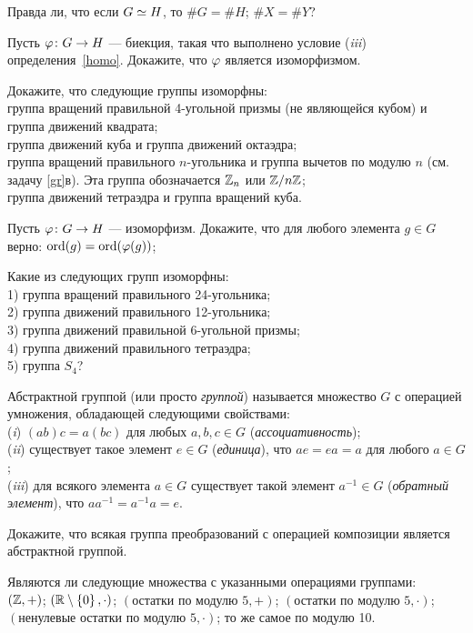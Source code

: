 \documentclass[a4paper,12pt]{article}
\begin{document}
Правда ли, что если $G\simeq H$, то
 $\#G = \#H$;
 $\#X = \#Y$?

Пусть $\varphi \colon G \rightarrow H$ --- биекция, такая что выполнено условие (\emph{iii}\/) определения~\ref{homo}. Докажите, что $\varphi$ является изоморфизмом.


Докажите, что следующие группы изоморфны:\\
 группа вращений правильной 4-угольной призмы (не являющейся кубом) и группа движений квадрата;\\
 группа движений куба и группа движений октаэдра;\\
 группа вращений правильного $n$-угольника и группа вычетов по модулю $n$ (см. задачу \ref{gr}в). Эта группа обозначается $\mathbb{Z}_n$ или $\mathbb{Z}/n\mathbb{Z}$;\\
 группа движений тетраэдра и группа вращений куба.


Пусть $\varphi\colon G\rightarrow H$ --- изоморфизм. Докажите, что
для любого элемента $g\in G$ верно: $\operatorname{ord}(g) = \operatorname{ord}(\varphi(g))$;

Какие из следующих групп изоморфны:\\
1) группа вращений правильного 24-угольника;\\
2) группа движений правильного 12-угольника;\\
3) группа движений правильной 6-угольной призмы;\\
4) группа движений правильного тетраэдра;\\
5) группа $S_4$?




 Абстрактной  группой (или просто \emph{группой}) называется множество $G$ с операцией умножения, обладающей следующими свойствами:\\
(\emph{i}\/) $(ab)c = a(bc)$ для любых $a,b,c\in G$ (\emph{ассоциативность});\\
(\emph{ii}\/) существует такое элемент $e\in G$ (\emph{единица}), что $ae=ea=a$ для любого $a\in G$;\\
(\emph{iii}\/) для всякого элемента $a\in G$ существует такой элемент $a^{-1}\in G$ (\emph{обратный элемент}), что $a a^{-1} = a^{-1} a = e$.

Докажите, что всякая группа преобразований с операцией композиции является абстрактной группой.

\label{gr}
Являются ли  следующие множества с указанными операциями группами:\\
 $(\mathbb{Z}, + )$;  $(\mathbb{R}\setminus \left\{0\right\}, \cdot)$;  $(\text{остатки по модулю }5, +)$;  $(\text{остатки по модулю }5, \cdot)$;\\  $(\text{ненулевые остатки по модулю }5, \cdot)$;  то же самое по модулю 10.
\end{document}
